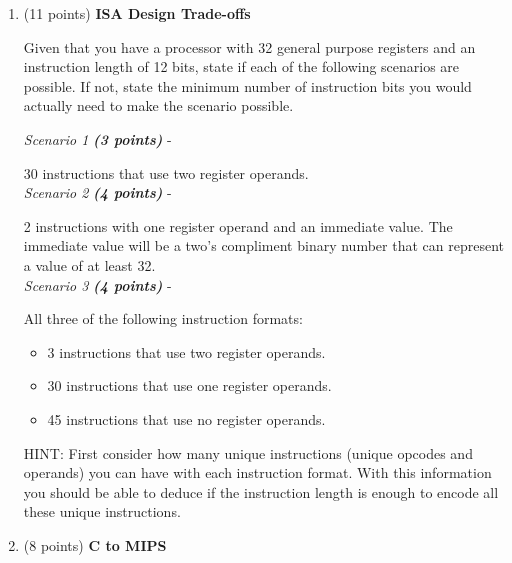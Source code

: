 \documentclass[a4paper,10pt]{article}
\begin{document}
\begin{enumerate}
\vspace{\baselineskip}
\begin{comment}
    QUESTION 2
\end{comment}

\item (11 points) \textbf{ISA Design Trade-offs}

Given that you have a processor with 32 general purpose registers and an instruction length of 12 bits, state if each of the following scenarios are possible. If not, state the minimum number of instruction bits you would actually need to make the scenario possible.

    \emph{Scenario 1} \textbf{\textit{(3 points)}} -
    
    30 instructions that use two register operands.\\
    
    \emph{Scenario 2} \textbf{\textit{(4 points)}} -
    
    2 instructions with one register operand and an immediate value. The immediate value will be a two's compliment binary number that can represent a value of at least 32.\\
    
    \emph{Scenario 3} \textbf{\textit{(4 points)}} -
    
    All three of the following instruction formats:
    \begin{itemize}
        \item 3 instructions that use two register operands.
        \item 30 instructions that use one register operands.
        \item 45 instructions that use no register operands.
    \end{itemize}

    HINT: First consider how many unique instructions (unique opcodes and operands) you can have with each instruction format. With this information you should be able to deduce if the instruction length is enough to encode all these unique instructions. \\

\vspace{\baselineskip}

\begin{comment}
    QUESTION 3
\end{comment}

\item (8 points) \textbf{C to MIPS} 


\end{enumerate}
\end{document}
